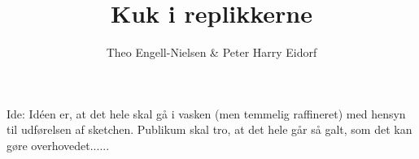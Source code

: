 \documentclass[a4paper,11pt]{article}
\begin{document}
\title{Kuk i replikkerne}

\author{ Theo Engell-Nielsen \& Peter Harry Eidorf}


\maketitle

\begin{roles}



\end{roles}

Ide:  Id\'een er, at det hele skal gå i vasken (men
      temmelig raffineret) med hensyn til udførelsen af
      sketchen. Publikum skal tro, at det hele går så galt,
      som det kan gøre overhovedet......
\end{document}
